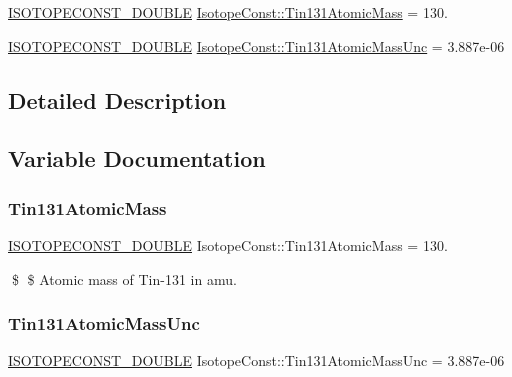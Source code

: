 \begin{DoxyCompactItemize}
\item 
\mbox{\hyperlink{group___isotope_const-_macros_ga8f45a7272ce02c0b4c65c44636ed719a}{I\+S\+O\+T\+O\+P\+E\+C\+O\+N\+S\+T\+\_\+\+D\+O\+U\+B\+LE}} \mbox{\hyperlink{group___isotope_const-_tin-_sn131_ga9c909e7cf89c1def4a0865abbbd3cd23}{Isotope\+Const\+::\+Tin131\+Atomic\+Mass}} = 130.
\item 
\mbox{\hyperlink{group___isotope_const-_macros_ga8f45a7272ce02c0b4c65c44636ed719a}{I\+S\+O\+T\+O\+P\+E\+C\+O\+N\+S\+T\+\_\+\+D\+O\+U\+B\+LE}} \mbox{\hyperlink{group___isotope_const-_tin-_sn131_ga7f6e1e083639277584b9bc89cc2d731a}{Isotope\+Const\+::\+Tin131\+Atomic\+Mass\+Unc}} = 3.\+887e-\/06
\end{DoxyCompactItemize}


\subsection{Detailed Description}


\subsection{Variable Documentation}
\mbox{\label{group___isotope_const-_tin-_sn131_ga9c909e7cf89c1def4a0865abbbd3cd23}} 
\subsubsection{\texorpdfstring{Tin131\+Atomic\+Mass}{Tin131AtomicMass}}
{\footnotesize\ttfamily \mbox{\hyperlink{group___isotope_const-_macros_ga8f45a7272ce02c0b4c65c44636ed719a}{I\+S\+O\+T\+O\+P\+E\+C\+O\+N\+S\+T\+\_\+\+D\+O\+U\+B\+LE}} Isotope\+Const\+::\+Tin131\+Atomic\+Mass = 130.}

\$ \$ Atomic mass of Tin-\/131 in amu. \mbox{\label{group___isotope_const-_tin-_sn131_ga7f6e1e083639277584b9bc89cc2d731a}} 
\subsubsection{\texorpdfstring{Tin131\+Atomic\+Mass\+Unc}{Tin131AtomicMassUnc}}
{\footnotesize\ttfamily \mbox{\hyperlink{group___isotope_const-_macros_ga8f45a7272ce02c0b4c65c44636ed719a}{I\+S\+O\+T\+O\+P\+E\+C\+O\+N\+S\+T\+\_\+\+D\+O\+U\+B\+LE}} Isotope\+Const\+::\+Tin131\+Atomic\+Mass\+Unc = 3.\+887e-\/06}

